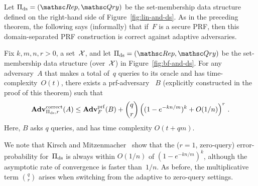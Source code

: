  Let $\setprim_{\mathrm{ds}}= (\Rep, \Qry)$
be the set-membership data structure defined on the right-hand side
of Figure~\ref{fig:lin-and-ds}. As in the preceding theorem, the
following says (informally) that if~$F$ is a secure PRF, then this
domain-separated PRF construction is correct against adaptive
adversaries.


\begin{theorem}\label{thm2}\label{thm:ds-correctness}
Fix $k,m,n,r>0$, a set~${\cal X}$, and let $\setprim_{\mathrm{ds}}= (\Rep, \Qry)$ be the set-membership data structure (over~${\cal X}$) in Figure~\ref{fig:bf-and-ds}.  For any adversary~$A$ that makes a total of~$q$ queries to its oracle and has time-complexity~$O(t)$, there exists a prf-adversary ~$B$ (explicitly constructed in the proof of this theorem) such that
\[
\mathrm{\mathbf{Adv}}^{\mathrm{correct}}_{\Pi_{\mathrm{ds}},r}(A) \leq  \mathbf{Adv}^{\mathrm{prf}}_{F}(B)  + {\dbinom{q}{r}} \left( (1-e^{-kn/m})^k + O(1/n) \right)^r\,.
\]
Here, $B$ asks $q$ queries, and has time complexity $O(t+qm)$.
\end{theorem}
We note that Kirsch and Mitzenmacher~\cite{kirsch2006less} show
that the ($r=1$, zero-query) error-probability for~$\Pi_\mathrm{ds}$ is
always within $O(1/n)$ of $(1-e^{-kn/m})^k$, although the asymptotic
rate of convergence is faster than~$1/n$.   As before, the multiplicative term $\binom{q}{r}$ arises when switching from the adaptive to zero-query settings.



